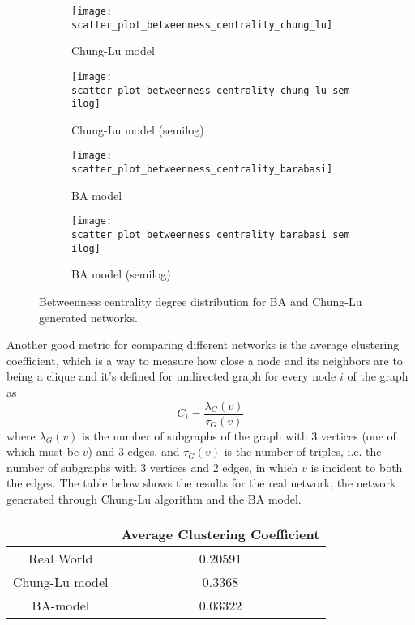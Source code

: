 		\begin{figure}[htbp]
		\centering
		\begin{subfigure}{0.49\textwidth}
			\centering
			\texttt{[image: scatter\_plot\_betweenness\_centrality\_chung\_lu]}
			\caption{Chung-Lu model}
		\end{subfigure}
		\begin{subfigure}{0.49\textwidth}
			\centering
			\texttt{[image: scatter\_plot\_betweenness\_centrality\_chung\_lu\_semilog]}
			\caption{Chung-Lu model (semilog)}
		\end{subfigure}
		
		\begin{subfigure}{0.49\textwidth}
			\centering
			\texttt{[image: scatter\_plot\_betweenness\_centrality\_barabasi]}
			\caption{BA model}
		\end{subfigure}
		\begin{subfigure}{0.49\textwidth}
			\centering
			\texttt{[image: scatter\_plot\_betweenness\_centrality\_barabasi\_semilog]}
			\caption{BA model (semilog)}
		\end{subfigure}
		\caption{Betweenness centrality degree distribution for BA and Chung-Lu generated networks.}
		\label{betweenness_centrality_degree_models}
	\end{figure}
	
	Another good metric for comparing different networks is the average clustering coefficient, which is a way to measure how close a node and its neighbors are to being a clique and it's defined for undirected graph for every node $i$ of the graph as $$C_i = \frac{\lambda_G(v)}{\tau_G(v)}$$ where $\lambda_G(v)$ is the number of subgraphs of the graph with 3 vertices (one of which must be $v$) and 3 edges, and $\tau_G(v)$ is the number of triples, i.e. the number of subgraphs with 3 vertices and 2 edges, in which $v$ is incident to both the edges. The table below shows the results for the real network, the network generated through Chung-Lu algorithm and the BA model.
	\begin{center}
		\begin{tabulary}{0.75\linewidth}{| C | C |}
			\hline
			& Average Clustering Coefficient \\ \hline
			Real World & 0.20591 \\ \hline
			Chung-Lu model & 0.3368 \\ \hline
			BA-model & 0.03322 \\
			\hline
		\end{tabulary}
	\end{center}


